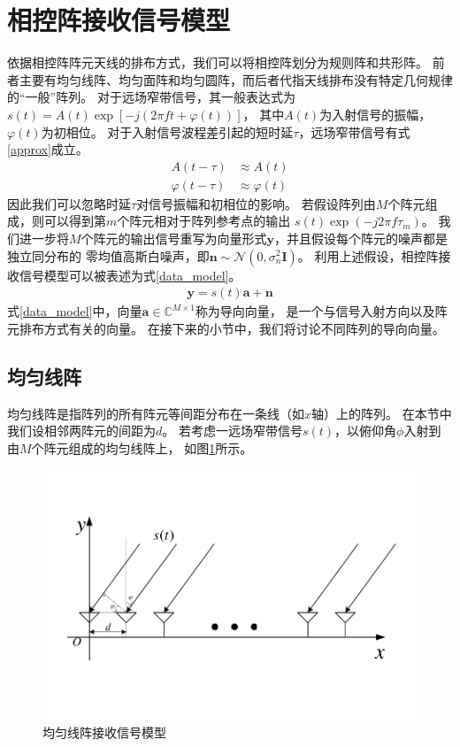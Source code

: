 \documentclass[master]{thesis-uestc}
\begin{document}
\section{相控阵接收信号模型}
依据相控阵阵元天线的排布方式，我们可以将相控阵划分为规则阵和共形阵。
前者主要有均匀线阵、均匀面阵和均匀圆阵，而后者代指天线排布没有特定几何规律的“一般”阵列。
对于远场窄带信号，其一般表达式为$s(t)=A(t)\exp\left[-j\left(2\pi ft+\varphi(t)\right)\right]$，
其中$A(t)$为入射信号的振幅，$\varphi(t)$为初相位。
对于入射信号波程差引起的短时延$\tau$，远场窄带信号有式\eqref{approx}成立。
\begin{equation}\label{approx}
\begin{aligned}
    A(t-\tau) &\approx A(t) \\
    \varphi(t-\tau) &\approx \varphi(t)
\end{aligned}
\end{equation}
因此我们可以忽略时延$\tau$对信号振幅和初相位的影响。
若假设阵列由$M$个阵元组成，则可以得到第$m$个阵元相对于阵列参考点的输出
$s(t)\exp\left(-j2\pi f\tau_m\right)$。
我们进一步将$M$个阵元的输出信号重写为向量形式$\bm{y}$，并且假设每个阵元的噪声都是独立同分布的
零均值高斯白噪声，即$\bm{n}\sim\mathcal{N}\left(0,\sigma^2_n\bm{I}\right)$。
利用上述假设，相控阵接收信号模型可以被表述为式\eqref{data_model}。
\begin{equation}\label{data_model}
    \begin{aligned}
        \bm{y} = s(t)\bm{a} + \bm{n}
    \end{aligned}
\end{equation}
式\eqref{data_model}中，向量$\bm{a}\in\mathbb{C}^{M\times1}$称为导向向量，
是一个与信号入射方向以及阵元排布方式有关的向量。
在接下来的小节中，我们将讨论不同阵列的导向向量。

\subsection{均匀线阵}
均匀线阵是指阵列的所有阵元等间距分布在一条线（如$x$轴）上的阵列。
在本节中我们设相邻两阵元的间距为$d$。
若考虑一远场窄带信号$s(t)$，以俯仰角$\phi$入射到由$M$个阵元组成的均匀线阵上，
如图\ref{ULA}所示。
\begin{figure}[h]
\includegraphics[scale=0.8]{pic/ULA.pdf}
\caption{均匀线阵接收信号模型}
\label{ULA}
\end{figure}
\end{document}
